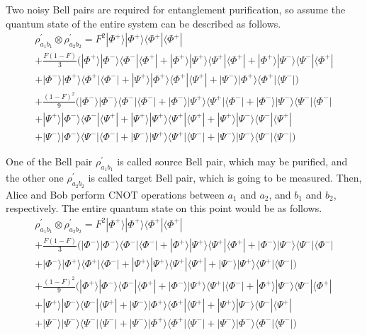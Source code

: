 Two noisy Bell pairs are required for entanglement purification, so assume the quantum state of the entire system can be described as follows.
\begin{multline*}
\rho^{'}_{a_1 b_1} \otimes \rho^{'}_{a_2 b_2} = F^2|\Phi^+\rangle|\Phi^+\rangle\langle\Phi^+|\langle\Phi^+| \\ 
+ \frac{F(1-F)}{3}(|\Phi^+\rangle|\Phi^-\rangle\langle\Phi^-|\langle\Phi^+|+|\Phi^+\rangle|\Psi^+\rangle\langle\Psi^+|\langle\Phi^+|+|\Phi^+\rangle|\Psi^-\rangle\langle\Psi^-|\langle\Phi^+| \\
+|\Phi^-\rangle|\Phi^+\rangle\langle\Phi^+|\langle\Phi^-|+|\Psi^+\rangle|\Phi^+\rangle\langle\Phi^+|\langle\Psi^+|+|\Psi^-\rangle|\Phi^+\rangle\langle\Phi^+|\langle\Psi^-|) \\ 
+ \frac{(1-F)^2}{9}(|\Phi^-\rangle|\Phi^-\rangle\langle\Phi^-|\langle\Phi^-|+|\Phi^-\rangle|\Psi^+\rangle\langle\Psi^+|\langle\Phi^-|+|\Phi^-\rangle|\Psi^-\rangle\langle\Psi^-|\langle\Phi^-| \\
+ |\Psi^+\rangle|\Phi^-\rangle\langle\Phi^-|\langle\Psi^+|+|\Psi^+\rangle|\Psi^+\rangle\langle\Psi^+|\langle\Psi^+|+|\Psi^+\rangle|\Psi^-\rangle\langle\Psi^-|\langle\Psi^+| \\
+|\Psi^-\rangle|\Phi^-\rangle\langle\Psi^-|\langle\Phi^-|+|\Psi^-\rangle|\Psi^+\rangle\langle\Psi^+|\langle\Psi^-|+|\Psi^-\rangle|\Psi^-\rangle\langle\Psi^-|\langle\Psi^-|)
\end{multline*}

One of the Bell pair $\rho^{'}_{a_1 b_1}$ is called source Bell pair, which may be purified, and the other one $\rho^{'}_{a_2 b_2}$  is called target Bell pair, which is going to be measured. Then, Alice and Bob perform CNOT operations between $a_1$ and $a_2$, and $b_1$ and $b_2$, respectively.
The entire quantum state on this point would be as follows.
\begin{multline*}
  \rho^{'}_{a_1 b_1} \otimes \rho^{'}_{a_2 b_2} = F^2|\Phi^+\rangle|\Phi^+\rangle\langle\Phi^+|\langle\Phi^+| \\ 
  + \frac{F(1-F)}{3}(|\Phi^-\rangle|\Phi^-\rangle\langle\Phi^-|\langle\Phi^-|+|\Phi^+\rangle|\Psi^+\rangle\langle\Psi^+|\langle\Phi^+|+|\Phi^-\rangle|\Psi^-\rangle\langle\Psi^-|\langle\Phi^-| \\
  +|\Phi^-\rangle|\Phi^+\rangle\langle\Phi^+|\langle\Phi^-|+|\Psi^+\rangle|\Psi^+\rangle\langle\Psi^+|\langle\Psi^+|+|\Psi^-\rangle|\Psi^+\rangle\langle\Psi^+|\langle\Psi^-|) \\ 
  + \frac{(1-F)^2}{9}(|\Phi^+\rangle|\Phi^-\rangle\langle\Phi^-|\langle\Phi^+|+|\Phi^-\rangle|\Psi^+\rangle\langle\Psi^+|\langle\Phi^-|+|\Phi^+\rangle|\Psi^-\rangle\langle\Psi^-|\langle\Phi^+| \\
  + |\Psi^+\rangle|\Psi^-\rangle\langle\Psi^-|\langle\Psi^+|+|\Psi^-\rangle|\Phi^+\rangle\langle\Phi^+|\langle\Psi^+|+|\Psi^+\rangle|\Psi^-\rangle\langle\Psi^-|\langle\Psi^+| \\
  +|\Psi^-\rangle|\Psi^-\rangle\langle\Psi^-|\langle\Psi^-|+|\Psi^-\rangle|\Phi^+\rangle\langle\Phi^+|\langle\Psi^-|+|\Psi^-\rangle|\Phi^-\rangle\langle\Phi^-|\langle\Psi^-|)
  \end{multline*}

